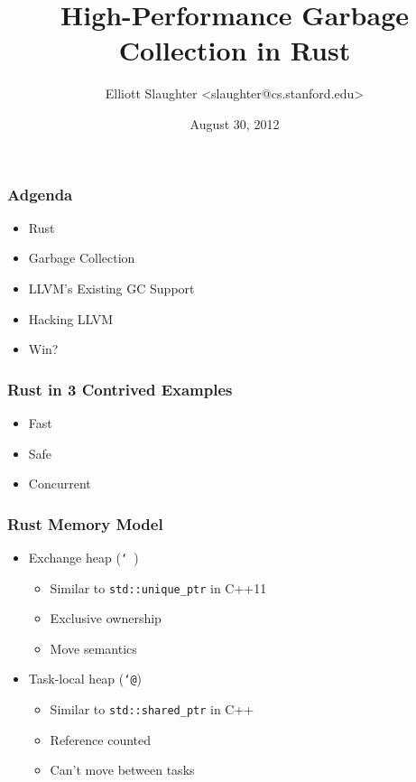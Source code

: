 \documentclass[ignorenonframetext,12pt]{beamer}
\title{High-Performance Garbage Collection in Rust}
\author{Elliott Slaughter \textless{}slaughter@cs.stanford.edu\textgreater{}}
\date{August 30, 2012}
\begin{document}
\frame{\titlepage}

\begin{frame}
\Large{}
\end{frame}

\begin{frame}\frametitle{Adgenda}
\Large
\begin{itemize}
  \item Rust
  \item Garbage Collection
  \item LLVM's Existing GC Support
  \item Hacking LLVM
  \item Win?
\end{itemize}
\end{frame}

\begin{frame}[fragile]\frametitle{Rust in 3 Contrived Examples}
\begin{itemize}
  \item<alert@2> Fast
  \item<alert@3> Safe
  \item<alert@4> Concurrent
\end{itemize}

\begin{overlayarea}{\textwidth}{\textheight}
\only<2>{}
\only<3>{}
\end{overlayarea}
\end{frame}

\begin{frame}\frametitle{Rust Memory Model}
\large
\begin{itemize}
  \item Exchange heap (\texttt{\char`~})
  \begin{itemize}
    \item Similar to \texttt{std::unique\_ptr} in C++11
    \item Exclusive ownership
    \item Move semantics
  \end{itemize}
  \item Task-local heap (\texttt{\char`@})
  \begin{itemize}
    \item Similar to \texttt{std::shared\_ptr} in C++
    \item Reference counted
    \item Can't move between tasks
  \end{itemize}
\end{itemize}
\end{frame}
\end{document}
